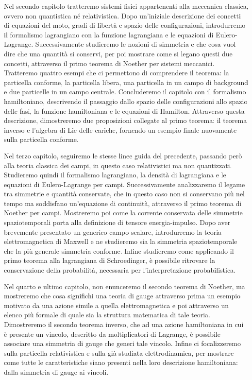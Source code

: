     Nel secondo capitolo tratteremo sistemi fisici appartenenti alla meccanica classica, ovvero non quantistica né relativistica. Dopo un'iniziale descrizione dei concetti di equazioni del moto, gradi di libertà e spazio delle configurazioni, introdurremo il formalismo lagrangiano con la funzione lagrangiana e le equazioni di Eulero-Lagrange. Successivamente studieremo le nozioni di simmetria e che cosa vuol dire che una quantità si conservi, per poi mostrare come si legano questi due concetti, attraverso il primo teorema di Noether per sistemi meccanici. Tratteremo quattro esempi che ci permettono di comprendere il teorema: la particella conforme, la particella libera, una particella in un campo di background e due particelle in un campo centrale. Concluderemo il capitolo con il formalismo hamiltoniano, descrivendo il passaggio dallo spazio delle configurazioni allo spazio delle fasi, la funzione hamiltoniana e le equazioni di Hamilton. Attraverso questa descrizione, dimostreremo due proposizioni collegate al primo teorema: il teorema inverso e l'algebra di Lie delle cariche, fornendo un esempio finale nuovamente sulla particella conforme.

    Nel terzo capitolo, seguiremo le stesse linee guida del precedente, passando però alla teoria classica dei campi, in questo caso relativistici ma non quantizzati. Studieremo quindi il formalismo lagrangiano, la densità di lagrangiana e le equazioni di Eulero-Lagrange per campi. Successivamente analizzaremo il legame tra simmetrie e quantità conservate, che in questo caso non si conservano più nel tempo ma soddisfano un'equazione di continuità, attraverso il primo teorema di Noether per campi. Mostreremo poi come la corrente conservata delle simmetrie spaziotemporali porta alla definizione di tensore energia-impulso. Dopo aver brevemente presentato un generico campo scalare, introdurremo la teoria elettromagnetica di Maxwell e ne studieremo sia la simmetria spaziotemporale che la più generale simmetria conforme. Infine studieremo come applicando il primo teorema alla lagrangiana di Schroedinger, è possibile ritrovare la conservazione della probabilità, necessaria per l'interpretazione probabilistica.

    Nel quarto e ultimo capitolo, non enunceremo il secondo teorema di Noether, ma mostreremo che cosa significhi una teoria di gauge attraverso prima un esempio motivato da una azione simile a quella elettromagnetica e poi attraverso un elenco più formale di quale sia la struttura matematica di tale teoria. Dimostreremo il secondo teorema inverso, che ad una azione hamiltoniana in cui è presente un vincolo, descritto da moltiplicatori di Lagrange, è possibile associare una simmetria di gauge che generi tale vincolo. Infine ci focalizzeremo sulla particella relativistica e sulla già studiata elettrodinamica, per mostrare come tutte le caratteristiche siano presenti nella loro descrizione hamiltoniana: dalla simmetria di gauge ai vincoli. 

